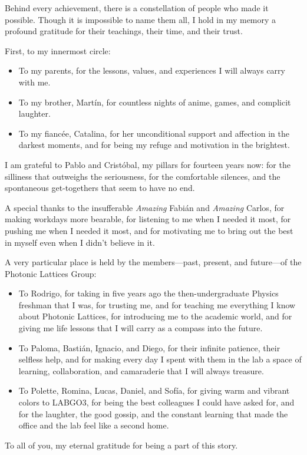 \documentclass[english, hyphens]{umemoria}
\begin{document}
\begin{thanks}
Behind every achievement, there is a constellation of people who made it possible. Though it is impossible to name them all, I hold in my memory a profound gratitude for their teachings, their time, and their trust.

First, to my innermost circle:
\begin{itemize}

\item To my parents, for the lessons, values, and experiences I will always carry with me.

\item To my brother, Martín, for countless nights of anime, games, and complicit laughter.

\item To my fiancée, Catalina, for her unconditional support and affection in the darkest moments, and for being my refuge and motivation in the brightest.
\end{itemize}
I am grateful to Pablo and Cristóbal, my pillars for fourteen years now: for the silliness that outweighs the seriousness, for the comfortable silences, and the spontaneous get-togethers that seem to have no end.

A special thanks to the insufferable \textit{Amazing} Fabián and \textit{Amazing} Carlos, for making workdays more bearable, for listening to me when I needed it most, for pushing me when I needed it most, and for motivating me to bring out the best in myself even when I didn't believe in it.

A very particular place is held by the members—past, present, and future—of the Photonic Lattices Group:
\begin{itemize}
\item To Rodrigo, for taking in five years ago the then-undergraduate Physics freshman that I was, for trusting me, and for teaching me everything I know about Photonic Lattices, for introducing me to the academic world, and for giving me life lessons that I will carry as a compass into the future.

\item To Paloma, Bastián, Ignacio, and Diego, for their infinite patience, their selfless help, and for making every day I spent with them in the lab a space of learning, collaboration, and camaraderie that I will always treasure.

\item To Polette, Romina, Lucas, Daniel, and Sofía, for giving warm and vibrant colors to LABGO3, for being the best colleagues I could have asked for, and for the laughter, the good gossip, and the constant learning that made the office and the lab feel like a second home.
\end{itemize}
To all of you, my eternal gratitude for being a part of this story.
\end{thanks}
\end{document}
